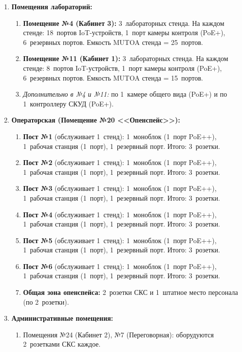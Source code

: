 \documentclass{bmstu}
\begin{document}
\begin{appendices}
\begin{enumerate}[label=\thesection.\arabic*]
    \item \textbf{Помещения лабораторий:}
    \begin{enumerate}[label=\thesection.\arabic{enumi}.\arabic*]
        \item \textbf{Помещение №4 (Кабинет 3):} 3~лабораторных стенда. На каждом стенде: 18~портов IoT-устройств, 1~порт камеры контроля (PoE+), 6~резервных портов. Емкость MUTOA стенда = 25~портов.
        \item \textbf{Помещение №11 (Кабинет 1):} 3~лабораторных стенда. На каждом стенде: 8~портов IoT-устройств, 1~порт камеры контроля (PoE+), 6~резервных портов. Емкость MUTOA стенда = 15~портов.
        \item \textit{Дополнительно в №4 и №11:} по 1~камере общего вида (PoE+) и по 1~контроллеру СКУД (PoE+).
    \end{enumerate}

    \item \textbf{Операторская (Помещение №20 <<Опенспейс>>):}
    \begin{enumerate}[label=\thesection.\arabic{enumi}.\arabic*]
        \item \textbf{Пост №1} (обслуживает 1~стенд): 1~моноблок (1~порт PoE++), 1~рабочая станция (1~порт), 1~резервный порт. Итого: 3~розетки.
        \item \textbf{Пост №2} (обслуживает 1~стенд): 1~моноблок (1~порт PoE++), 1~рабочая станция (1~порт), 1~резервный порт. Итого: 3~розетки.
        \item \textbf{Пост №3} (обслуживает 1~стенд): 1~моноблок (1~порт PoE++), 1~рабочая станция (1~порт), 1~резервный порт. Итого: 3~розетки.
        \item \textbf{Пост №4} (обслуживает 1~стенд): 1~моноблок (1~порт PoE++), 1~рабочая станция (1~порт), 1~резервный порт. Итого: 3~розетки.
        \item \textbf{Пост №5} (обслуживает 1~стенд): 1~моноблок (1~порт PoE++), 1~рабочая станция (1~порт), 1~резервный порт. Итого: 3~розетки.
        \item \textbf{Пост №6} (обслуживает 1~стенд): 1~моноблок (1~порт PoE++), 1~рабочая станция (1~порт), 1~резервный порт. Итого: 3~розетки.
        \item \textbf{Общая зона опенспейса:} 2~розетки СКС и 1~штатное место персонала (по 2~розетки).
    \end{enumerate}

    \item \textbf{Административные помещения:}
    \begin{enumerate}[label=\thesection.\arabic{enumi}.\arabic*]
        \item Помещения №24 (Кабинет 2), №7 (Переговорная): оборудуются 2~розетками СКС каждое.
    \end{enumerate}


\end{enumerate}
\end{appendices}
\end{document}
